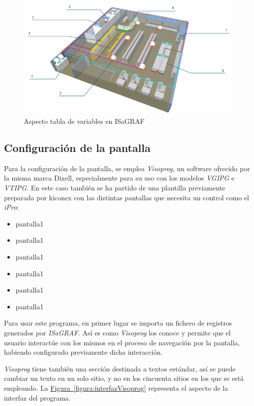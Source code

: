 \begin{figure}[h]
  \centering
  \includegraphics[width=\textwidth, keepaspectratio]{img/planoSupermercado}
  \caption{Aspecto tabla de variables en ISaGRAF}
  \label{figura:variablesIsagraf}
\end{figure}

\subsection{Configuración de la pantalla}
\label{subsec:displayconfig}

Para la configuración de la pantalla, se emplea \textit{Visoprog}, un software ofrecido por la misma marca Dixell, especialmente para su uso con los modelos \textit{VGIPG} e \textit{VTIPG}. En este caso también se ha partido de una plantilla previamente preparada por kiconex con las distintas pantallas que necesita un control como el \textit{iPro}:

\begin{itemize}
  \item pantalla1  
  \item pantalla1 
  \item pantalla1
  \item pantalla1 
  \item pantalla1 
  \item pantalla1 
\end{itemize}

Para usar este programa, en primer lugar se importa un fichero de registros generados por \textit{ISaGRAF}. Así es como \textit{Visoprog} los conoce y permite que el usuario interactúe con los mismos en el proceso de navegación por la pantalla, habiendo configurado previamente dicha interacción.

\textit{Visoprog} tiene también una sección destinada a textos estándar, así se puede cambiar un texto en un solo sitio, y no en los cincuenta sitios en los que se está empleando. La \hyperref[figura:interfazVisoprog]{Figura~\ref{figura:interfazVisoprog}} representa el aspecto de la interfaz del programa.

